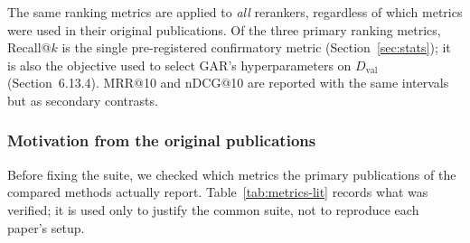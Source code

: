 \documentclass[11pt,a4paper]{article}
\begin{document}
The same ranking metrics are applied to \emph{all} rerankers, regardless of which metrics were used in their original publications. Of the three primary ranking metrics, Recall@$k$ is the single pre-registered confirmatory metric (Section~\ref{sec:stats}); it is also the objective used to select GAR's hyperparameters on $D_{\mathrm{val}}$ (Section~6.13.4). MRR@10 and nDCG@10 are reported with the same intervals but as secondary contrasts.

\subsubsection{Motivation from the original publications}
\label{sec:metrics-lit}

Before fixing the suite, we checked which metrics the primary publications of the compared methods actually report. Table~\ref{tab:metrics-lit} records what was verified; it is used only to justify the common suite, not to reproduce each paper's setup.
\end{document}

